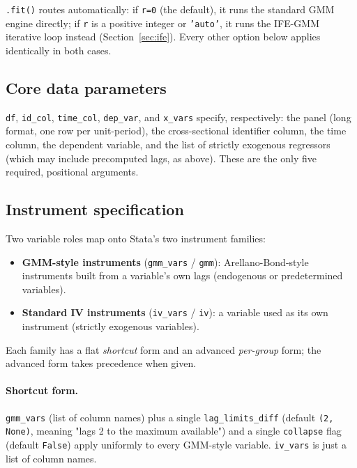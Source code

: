 \documentclass[11pt,a4paper]{article}
\begin{document}
\texttt{.fit()} routes automatically: if \texttt{r=0} (the default), it runs
the standard GMM engine directly; if \texttt{r} is a positive integer or
\texttt{'auto'}, it runs the IFE-GMM iterative loop instead
(Section~\ref{sec:ife}). Every other option below applies identically in
both cases.

\subsection{Core data parameters}

\texttt{df}, \texttt{id\_col}, \texttt{time\_col}, \texttt{dep\_var}, and
\texttt{x\_vars} specify, respectively: the panel (long format, one row per
unit-period), the cross-sectional identifier column, the time column, the
dependent variable, and the list of strictly exogenous regressors (which may
include precomputed lags, as above). These are the only five required,
positional arguments.

\subsection{Instrument specification}
\label{sec:instruments}

Two variable roles map onto Stata's two instrument families:

\begin{itemize}[nosep]
  \item \textbf{GMM-style instruments} (\texttt{gmm\_vars} / \texttt{gmm}):
        Arellano-Bond-style instruments built from a variable's own lags
        (endogenous or predetermined variables).
  \item \textbf{Standard IV instruments} (\texttt{iv\_vars} / \texttt{iv}):
        a variable used as its own instrument (strictly exogenous variables).
\end{itemize}

Each family has a flat \emph{shortcut} form and an advanced \emph{per-group}
form; the advanced form takes precedence when given.

\paragraph{Shortcut form.} \texttt{gmm\_vars} (list of column names) plus a
single \texttt{lag\_limits\_diff} (default \texttt{(2, None)}, meaning "lags
2 to the maximum available") and a single \texttt{collapse} flag (default
\texttt{False}) apply uniformly to every GMM-style variable. \texttt{iv\_vars}
is just a list of column names.
\end{document}
